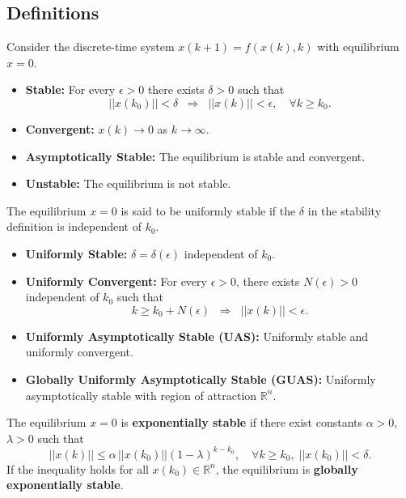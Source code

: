 \subsection{Definitions}
\begin{definition}
Consider the discrete-time system $x(k+1) = f(x(k),k)$ with equilibrium $x=0$.  
\begin{itemize}
    \item \textbf{Stable:} For every $\epsilon>0$ there exists $\delta>0$ such that
    \[
    ||x(k_0)|| < \delta \;\; \Rightarrow \;\; ||x(k)|| < \epsilon, \quad \forall k \ge k_0.
    \]
    \item \textbf{Convergent:} $x(k) \to 0$ as $k \to \infty$.
    \item \textbf{Asymptotically Stable:} The equilibrium is stable and convergent.  
    \item \textbf{Unstable:} The equilibrium is not stable.  
\end{itemize}
\end{definition}

\begin{definition}
The equilibrium $x=0$ is said to be uniformly stable if the $\delta$ in the stability definition is independent of $k_0$.  
\begin{itemize}
    \item \textbf{Uniformly Stable:} $\delta = \delta(\epsilon)$ independent of $k_0$.  
    \item \textbf{Uniformly Convergent:} For every $\epsilon>0$, there exists $N(\epsilon)>0$ independent of $k_0$ such that
    \[
    k \ge k_0 + N(\epsilon) \;\; \Rightarrow \;\; ||x(k)|| < \epsilon.
    \]
    \item \textbf{Uniformly Asymptotically Stable (UAS):} Uniformly stable and uniformly convergent.  
    \item \textbf{Globally Uniformly Asymptotically Stable (GUAS):} Uniformly asymptotically stable with region of attraction $\mathbb{R}^n$.  
\end{itemize}
\end{definition}

\begin{definition}
The equilibrium $x=0$ is \textbf{exponentially stable} if there exist constants $\alpha>0$, $\lambda>0$ such that
\[
||x(k)|| \leq \alpha \, ||x(k_0)|| (1-\lambda)^{k-k_0}, \quad \forall k \ge k_0, \; ||x(k_0)|| < \delta.
\]
If the inequality holds for all $x(k_0)\in\mathbb{R}^n$, the equilibrium is \textbf{globally exponentially stable}.
\end{definition}

